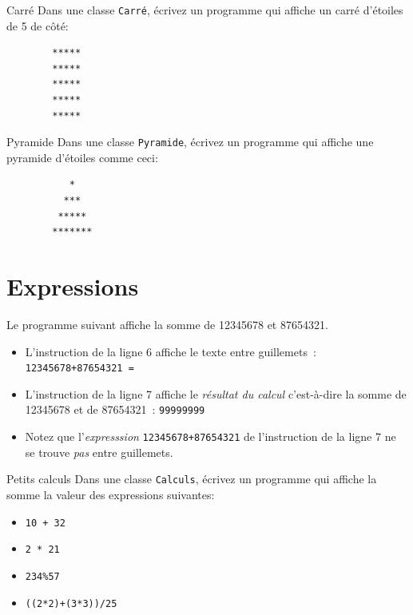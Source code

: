 \documentclass[a4paper,11pt]{article}
\begin{document}
	\begin{Exercice}{Carré}
		Dans une classe \texttt{Carré}, écrivez un programme qui affiche un carré d'étoiles de 5 de côté:

		\begin{verbatim}
		*****
		*****
		*****
		*****
		*****
		\end{verbatim}
	\end{Exercice}

	\begin{Exercice}{Pyramide}
		Dans une classe \texttt{Pyramide}, écrivez un programme qui affiche une pyramide d'étoiles comme ceci:

		\begin{verbatim}
		   *
		  ***
		 *****
		*******
		\end{verbatim}
	\end{Exercice}



\section{Expressions}

	Le programme suivant affiche la somme de 12345678 et 87654321.
	

	\begin{itemize}
		\item	L'instruction de la ligne 6 affiche le texte entre guillemets~: \texttt{12345678+87654321 = }
	
		\item L'instruction de la ligne 7 affiche le \emph{résultat du calcul} 
			c'est-à-dire la somme de 12345678 et de 87654321~:  \texttt{99999999}
	
		\item Notez que l'\emph{expresssion} \texttt{12345678+87654321} 
			de l'instruction de la ligne 7 ne se trouve \emph{pas} entre guillemets.
	\end{itemize}


	\begin{Exercice}{Petits calculs}
		Dans une classe \texttt{Calculs}, écrivez un programme qui affiche la somme la valeur des expressions
		suivantes:
		\begin{itemize}
			\item	 \texttt{10 + 32}
			\item  \texttt{2 * 21}
			\item  \texttt{234\%57}
			\item  \texttt{((2*2)+(3*3))/25}
		\end{itemize}
	\end{Exercice}
	
\end{document}
